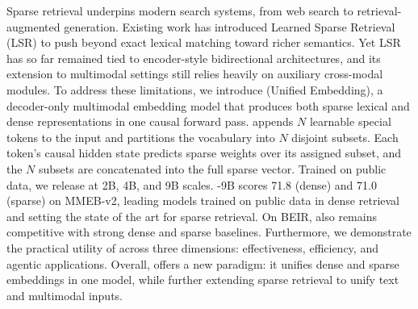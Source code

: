 
Sparse retrieval underpins modern search systems, from web search to retrieval-augmented generation. 
Existing work has introduced Learned Sparse Retrieval (LSR) to push beyond exact lexical matching toward richer semantics.
Yet LSR has so far remained tied to encoder-style bidirectional architectures, and its extension to multimodal settings still relies heavily on auxiliary cross-modal modules. 
To address these limitations, we introduce \ours (Unified Embedding), a decoder-only multimodal embedding model that produces both sparse lexical and dense representations in one causal forward pass. 
\ours appends $N$ learnable special tokens to the input and partitions the vocabulary into $N$ disjoint subsets. Each token's causal hidden state predicts sparse weights over its assigned subset, and the $N$ subsets are concatenated into the full sparse vector. 
Trained on public data, we release \ours at 2B, 4B, and 9B scales. 
\ours-9B scores 71.8 (dense) and 71.0 (sparse) on MMEB-v2, leading models trained on public data in dense retrieval and setting the state of the art for sparse retrieval. On BEIR, \ours also remains competitive with strong dense and sparse baselines. 
Furthermore, we demonstrate the practical utility of \ours across three dimensions: effectiveness, efficiency, and agentic applications. 
Overall, \ours offers a new paradigm: it unifies dense and sparse embeddings in one model, while further extending sparse retrieval to unify text and multimodal inputs. 